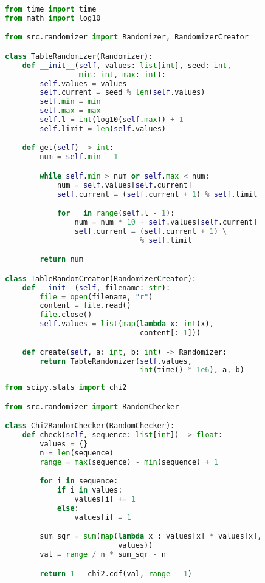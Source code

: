 \begin{lstlisting}[caption={Класс, реализующий табличный метод}, language=python]
from time import time
from math import log10

from src.randomizer import Randomizer, RandomizerCreator

class TableRandomizer(Randomizer):
    def __init__(self, values: list[int], seed: int,
                 min: int, max: int):
        self.values = values
        self.current = seed % len(self.values)
        self.min = min
        self.max = max
        self.l = int(log10(self.max)) + 1
        self.limit = len(self.values)

    def get(self) -> int:
        num = self.min - 1

        while self.min > num or self.max < num:
            num = self.values[self.current]
            self.current = (self.current + 1) % self.limit

            for _ in range(self.l - 1):
                num = num * 10 + self.values[self.current]
                self.current = (self.current + 1) \
                               % self.limit

        return num

class TableRandomCreator(RandomizerCreator):
    def __init__(self, filename: str):
        file = open(filename, "r")
        content = file.read()
        file.close()
        self.values = list(map(lambda x: int(x),
                               content[:-1]))

    def create(self, a: int, b: int) -> Randomizer:
        return TableRandomizer(self.values,
                               int(time() * 1e6), a, b)
\end{lstlisting}

\begin{lstlisting}[caption={Класс, реализующий критерий $\chi^2$}, language=python]
from scipy.stats import chi2

from src.randomizer import RandomChecker

class Chi2RandomChecker(RandomChecker):
    def check(self, sequence: list[int]) -> float:
        values = {}
        n = len(sequence)
        range = max(sequence) - min(sequence) + 1

        for i in sequence:
            if i in values:
                values[i] += 1
            else:
                values[i] = 1

        sum_sqr = sum(map(lambda x : values[x] * values[x],
                          values))
        val = range / n * sum_sqr - n

        return 1 - chi2.cdf(val, range - 1)
\end{lstlisting}

